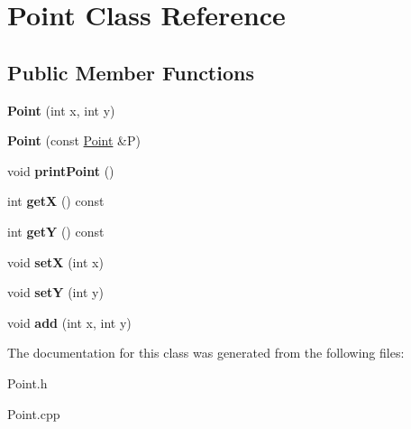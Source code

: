 \hypertarget{classPoint}{}\section{Point Class Reference}
\label{classPoint}
\subsection*{Public Member Functions}
\begin{DoxyCompactItemize}
\item 
{\bfseries Point} (int x, int y)\hypertarget{classPoint_a001c4958c310b248f5c26037aea38a9c}{}\label{classPoint_a001c4958c310b248f5c26037aea38a9c}

\item 
{\bfseries Point} (const \hyperlink{classPoint}{Point} \&P)\hypertarget{classPoint_a7e32c5a7f878c49ed9f1777b622cc06c}{}\label{classPoint_a7e32c5a7f878c49ed9f1777b622cc06c}

\item 
void {\bfseries print\+Point} ()\hypertarget{classPoint_ad32f6a515be1cf069bf5ea6b89178ae9}{}\label{classPoint_ad32f6a515be1cf069bf5ea6b89178ae9}

\item 
int {\bfseries getX} () const \hypertarget{classPoint_abe622fffc8785b0c2e06cdac681b9837}{}\label{classPoint_abe622fffc8785b0c2e06cdac681b9837}

\item 
int {\bfseries getY} () const \hypertarget{classPoint_a10f31e48e2dbc22e3660ca769b8d5d65}{}\label{classPoint_a10f31e48e2dbc22e3660ca769b8d5d65}

\item 
void {\bfseries setX} (int x)\hypertarget{classPoint_acdc86ab607b2ae8415152883e2629015}{}\label{classPoint_acdc86ab607b2ae8415152883e2629015}

\item 
void {\bfseries setY} (int y)\hypertarget{classPoint_afccad787a359f062efc1af5e935a99ba}{}\label{classPoint_afccad787a359f062efc1af5e935a99ba}

\item 
void {\bfseries add} (int x, int y)\hypertarget{classPoint_a339fe8d180ebbc9079d349c23dc477fe}{}\label{classPoint_a339fe8d180ebbc9079d349c23dc477fe}

\end{DoxyCompactItemize}


The documentation for this class was generated from the following files\+:\begin{DoxyCompactItemize}
\item 
Point.\+h\item 
Point.\+cpp\end{DoxyCompactItemize}
